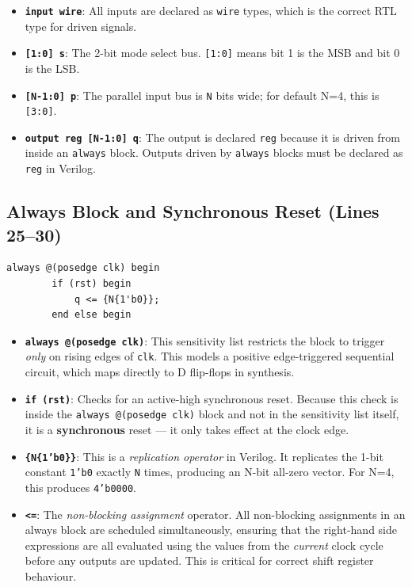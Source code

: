 \documentclass[12pt,a4paper]{report}
\newcommand{\signal}[1]{\texttt{\textcolor{codeblue}{#1}}}
\begin{document}
\begin{itemize}
    \item \textbf{\texttt{input wire}}: All inputs are declared as \texttt{wire} types, which is the correct RTL type for driven signals.
    \item \textbf{\texttt{[1:0] s}}: The 2-bit mode select bus. \texttt{[1:0]} means bit 1 is the MSB and bit 0 is the LSB.
    \item \textbf{\texttt{[N-1:0] p}}: The parallel input bus is \texttt{N} bits wide; for default N=4, this is \texttt{[3:0]}.
    \item \textbf{\texttt{output reg [N-1:0] q}}: The output is declared \texttt{reg} because it is driven from inside an \texttt{always} block. Outputs driven by \texttt{always} blocks must be declared as \texttt{reg} in Verilog.
\end{itemize}

\subsection{Always Block and Synchronous Reset (Lines 25--30)}

\begin{lstlisting}[firstnumber=25, caption={Always block trigger and reset}]
    always @(posedge clk) begin
        if (rst) begin
            q <= {N{1'b0}};
        end else begin
\end{lstlisting}

\begin{itemize}
    \item \textbf{\texttt{always @(posedge clk)}}: This sensitivity list restricts the block to trigger \textit{only} on rising edges of \signal{clk}. This models a positive edge-triggered sequential circuit, which maps directly to D flip-flops in synthesis.
    \item \textbf{\texttt{if (rst)}}: Checks for an active-high synchronous reset. Because this check is inside the \texttt{always @(posedge clk)} block and not in the sensitivity list itself, it is a \textbf{synchronous} reset — it only takes effect at the clock edge.
    \item \textbf{\texttt{\{N\{1'b0\}\}}}: This is a \textit{replication operator} in Verilog. It replicates the 1-bit constant \texttt{1'b0} exactly \texttt{N} times, producing an N-bit all-zero vector. For N=4, this produces \texttt{4'b0000}.
    \item \textbf{\texttt{<=}}: The \textit{non-blocking assignment} operator. All non-blocking assignments in an always block are scheduled simultaneously, ensuring that the right-hand side expressions are all evaluated using the values from the \textit{current} clock cycle before any outputs are updated. This is critical for correct shift register behaviour.
\end{itemize}
\end{document}
